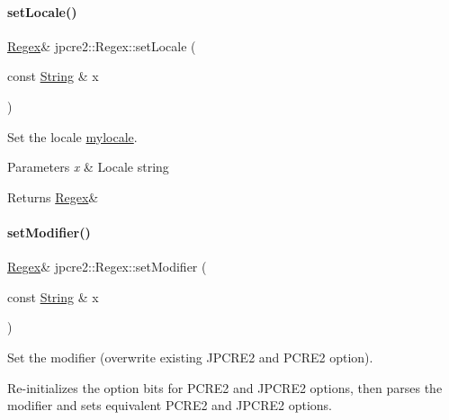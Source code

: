 \paragraph{\texorpdfstring{set\+Locale()}{setLocale()}}
{\footnotesize\ttfamily \hyperlink{classjpcre2_1_1Regex}{Regex}\& jpcre2\+::\+Regex\+::set\+Locale (\begin{DoxyParamCaption}\item[{const \hyperlink{namespacejpcre2_a91f03070152fb228bc116c5a737f1d16}{String} \&}]{x }\end{DoxyParamCaption})\hspace{0.3cm}{\ttfamily [inline]}}



Set the locale \hyperlink{classjpcre2_1_1Regex_a92a3ad992cade62d103248302f7e2f2d}{mylocale}. 


\begin{DoxyParams}{Parameters}
{\em x} & Locale string \\
\hline
\end{DoxyParams}
\begin{DoxyReturn}{Returns}
\hyperlink{classjpcre2_1_1Regex}{Regex}\& 
\end{DoxyReturn}
\hypertarget{classjpcre2_1_1Regex_aed9865b58c60945e19f36fa310f5a595_aed9865b58c60945e19f36fa310f5a595}{}\label{classjpcre2_1_1Regex_aed9865b58c60945e19f36fa310f5a595_aed9865b58c60945e19f36fa310f5a595} 
\paragraph{\texorpdfstring{set\+Modifier()}{setModifier()}}
{\footnotesize\ttfamily \hyperlink{classjpcre2_1_1Regex}{Regex}\& jpcre2\+::\+Regex\+::set\+Modifier (\begin{DoxyParamCaption}\item[{const \hyperlink{namespacejpcre2_a91f03070152fb228bc116c5a737f1d16}{String} \&}]{x }\end{DoxyParamCaption})\hspace{0.3cm}{\ttfamily [inline]}}



Set the modifier (overwrite existing J\+P\+C\+R\+E2 and P\+C\+R\+E2 option). 

Re-\/initializes the option bits for P\+C\+R\+E2 and J\+P\+C\+R\+E2 options, then parses the modifier and sets equivalent P\+C\+R\+E2 and J\+P\+C\+R\+E2 options.

